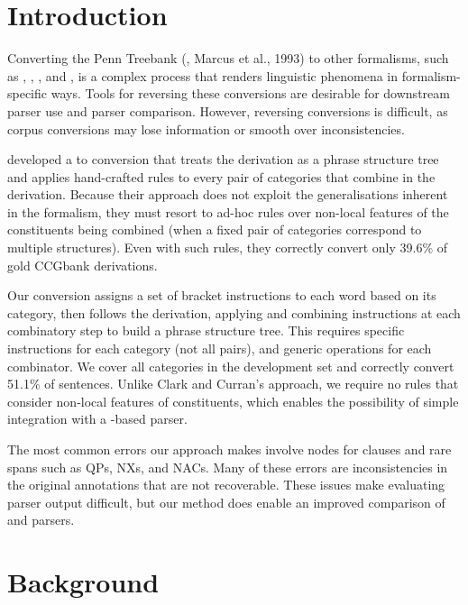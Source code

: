 \section{Introduction}

Converting the Penn Treebank (\ptb, Marcus et al., 1993)
\nocite{Marcus-Marcinkiewicz-Santorini:1993} to other formalisms, such as \hpsg
\parencite{Miyao-Ninomiya-Tsujii:2004}, \lfg \parencite{Cahill-etal:2008}, \ltag
\parencite{Xia:1999}, and \ccg \parencite{CCGBank}, is a complex process that renders
linguistic phenomena in formalism-specific ways.  Tools for reversing these
conversions are desirable for downstream parser use and parser comparison.
However, reversing conversions is difficult, as corpus conversions may lose
information or smooth over \ptb inconsistencies.

\textcite{Clark-Curran:2009} developed a \ccg to \ptb conversion that treats the
\ccg derivation as a phrase structure tree and applies hand-crafted rules to
every pair of categories that combine in the derivation.  Because their
approach does not exploit the generalisations inherent in the \ccg formalism,
they must resort to ad-hoc rules over non-local features of the \ccg
constituents being combined (when a fixed pair of \ccg categories correspond to
multiple \ptb structures).  Even with such rules, they correctly convert only
39.6\% of gold CCGbank derivations.

Our conversion assigns a set of bracket instructions to each word based on its \ccg
category, then follows the \ccg derivation, applying and combining instructions
at each combinatory step to build a phrase structure tree.  This requires
specific instructions for each category (not all pairs), and generic operations
for each combinator.  We cover all categories in the development set and
	correctly convert 51.1\% of sentences.  Unlike Clark and Curran's
	approach, we require no rules that consider non-local features of
	constituents, which enables the possibility of simple integration with a
	\cky-based parser.

The most common errors our approach makes involve nodes for clauses and rare
spans such as QPs, NXs, and NACs.  Many of these errors are inconsistencies in
the original \ptb annotations that are not recoverable.  These issues make
evaluating parser output difficult, but our method does enable an improved
comparison of \ccg and \ptb parsers.

\section{Background}

